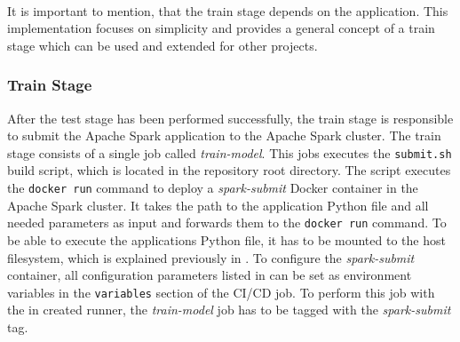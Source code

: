 \paragraph{}
It is important to mention, that the train stage depends on the application. This implementation focuses on simplicity and provides a general concept of a train stage which can be used and extended for other projects.


\subsubsection{Train Stage}
After the test stage has been performed successfully, the train stage is responsible to submit the Apache Spark application to the Apache Spark cluster.
The train stage consists of a single job called \textit{train-model}.
This jobs executes the \texttt{submit.sh} build script, which is located in the repository root directory. The script executes the \texttt{docker run} command to deploy a \textit{spark-submit} Docker container in the Apache Spark cluster. It takes the path to the application Python file and all needed parameters as input and forwards them to the \texttt{docker run} command. To be able to execute the applications Python file, it has to be mounted to the host filesystem, which is explained previously in .
To configure the \textit{spark-submit} container, all configuration parameters listed in  can be set as environment variables in the \texttt{variables} section of the CI/CD job.
To perform this job with the in  created runner, the \textit{train-model} job has to be tagged with the \textit{spark-submit} tag.


